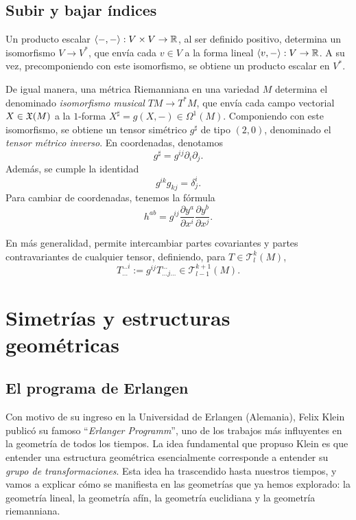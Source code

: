 \documentclass[11pt,a4paper]{amsbook}
\theoremstyle{remark} \newtheorem{rmk}[subsection]{Observación}
\theoremstyle{definition} \newtheorem{defn}[subsection]{Definición}
\theoremstyle{definition} \newtheorem{ex}[subsection]{Ejemplo}
\theoremstyle{definition} \newtheorem{ej}[subsection]{Ejercicio}
\begin{document}
\subsection{Subir y bajar índices} Un producto escalar $\langle-,-\rangle: V\times V \rightarrow \mathbb R$, al ser definido positivo, determina un isomorfismo $V\rightarrow V^*$, que envía cada $v\in V$ a la forma lineal $\langle v,-\rangle: V\rightarrow \mathbb R$. A su vez, precomponiendo con este isomorfismo, se obtiene un producto escalar en $V^*$.

De igual manera, una métrica Riemanniana en una variedad $M$ determina el denominado \emph{isomorfismo musical} $TM \rightarrow T^*M$, que envía cada campo vectorial $X \in \mathfrak X(M)$ a la $1$-forma $X^\sharp=g(X,-) \in \Omega^1(M)$. Componiendo con este isomorfismo, se obtiene un tensor simétrico $g^\sharp$ de tipo $(2,0)$, denominado el \emph{tensor métrico inverso}. En coordenadas, denotamos
\begin{equation*}
g^\sharp = g^{ij} \partial_i \partial_j.
\end{equation*}
Además, se cumple la identidad
\begin{equation*}
g^{ik} g_{kj} = \delta^i_j.
\end{equation*}
Para cambiar de coordenadas, tenemos la fórmula
\begin{equation*}
h^{ab} = g^{ij} \frac{\partial y^a}{\partial x^i} \frac{\partial y^b}{\partial x^j}.
\end{equation*}

En más generalidad, permite intercambiar partes covariantes y partes contravariantes de cualquier tensor, definiendo, para $T\in \mathcal{T}^k_{l}(M)$,
\begin{equation*}
 T^{\dots i}_{\dots} := g^{ij} T^{\dots}_{\dots j \dots} \in \mathcal{T}^{k+1}_{l-1}(M).
\end{equation*}
%

\section{Simetrías y estructuras geométricas}

\subsection{El programa de Erlangen}
Con motivo de su ingreso en la Universidad de Erlangen (Alemania), Felix Klein publicó su famoso ``\textit{Erlanger Programm}'', uno de los trabajos más influyentes en la geometría de todos los tiempos. La idea fundamental que propuso Klein es que entender una estructura geométrica esencialmente corresponde a entender su \emph{grupo de transformaciones}. Esta idea ha trascendido hasta nuestros tiempos, y vamos a explicar cómo se manifiesta en las geometrías que ya hemos explorado: la geometría lineal, la geometría afín, la geometría euclidiana y la geometría riemanniana.
\end{document}
